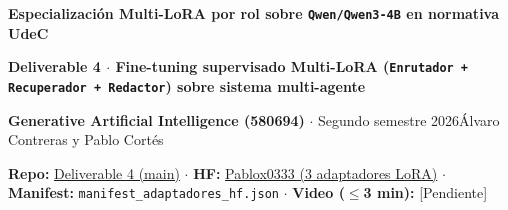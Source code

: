 \documentclass[10pt,a4paper]{article}
\newcommand{\REPO}{https://github.com/Pacortes2021/GENERATIVE-ARTIFICIAL-INTELLIGENCE-DELIVERABLE-1/tree/main/Deliverable\%204}
\newcommand{\HFPROF}{https://huggingface.co/Pablox0333}
\begin{document}
{\color{azul}\bfseries\fontsize{12.0}{13.2}\selectfont Especialización Multi-LoRA por rol sobre \texttt{Qwen/Qwen3-4B} en normativa UdeC}\par
{\color{acento}\bfseries\fontsize{8.0}{9.0}\selectfont Deliverable 4 $\cdot$ Fine-tuning supervisado Multi-LoRA (\texttt{Enrutador + Recuperador + Redactor}) sobre sistema multi-agente}\par
{\fontsize{7.1}{8.1}\selectfont \textbf{Generative Artificial Intelligence (580694)} $\cdot$ Segundo semestre 2026\hfill Álvaro Contreras y Pablo Cortés}\par
{\fontsize{7.05}{8.05}\selectfont \textbf{Repo:} \href{\REPO}{Deliverable 4 (main)} $\cdot$ \textbf{HF:} \href{\HFPROF}{Pablox0333 (3 adaptadores LoRA)} $\cdot$ \textbf{Manifest:} \texttt{manifest\_adaptadores\_hf.json} $\cdot$ \textbf{Video ($\leq$3 min):} [Pendiente]}\par
{}\vspace{1.2pt}
\end{document}

